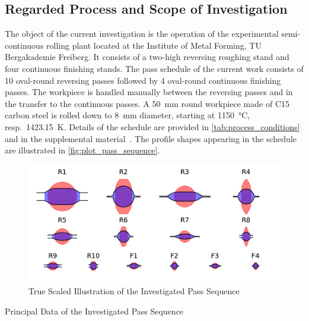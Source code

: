 \subsection{Regarded Process and Scope of Investigation}\label{subsec:regarded-process}

The object of the current investigation is the operation of the experimental semi-continuous rolling plant located at the Institute of Metal Forming, TU Bergakademie Freiberg.
It consists of a two-high reversing roughing stand and four continuous finishing stands.
The pass schedule of the current work consists of 10 oval-round reversing passes followed by 4 oval-round continuous finishing passes.
The workpiece is handled manually between the reversing passes and in the transfer to the continuous passes.
A \qty{50}{\milli\meter} round workpiece made of C15 carbon steel is rolled down to \qty{8}{\milli\meter} diameter, starting at \qty{1150}{\celsius}, resp.\ \qty{1423.15}{\kelvin}.
Details of the schedule are provided in \autoref{tab:process_conditions} and in the supplemental material~\cite{WeinerVariationSupplemental2024}.
The profile shapes appearing in the schedule are illustrated in \autoref{fig:plot_pass_sequence}.

\begin{figure}
    \centering
    \includegraphics{img/plot_pass_sequence}
    \caption{True Scaled Illustration of the Investigated Pass Sequence}
    \label{fig:plot_pass_sequence}
\end{figure}

\begin{table}
    \centering
    \caption{Principal Data of the Investigated Pass Sequence}
    \label{tab:process_conditions}
    
\end{table}

